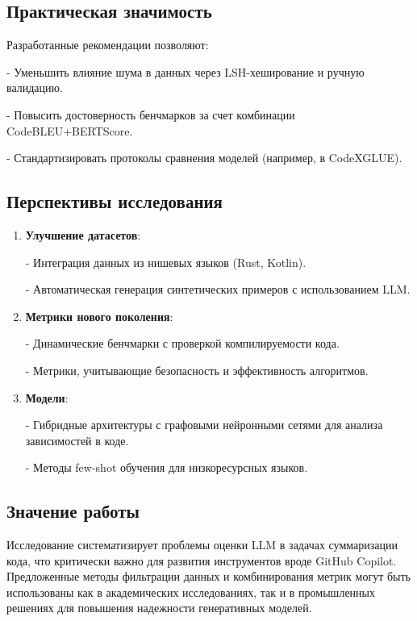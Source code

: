 \documentclass[14pt]{article}
\theoremstyle{definition}
\begin{document}
\subsection{Практическая значимость}
Разработанные рекомендации позволяют:

    
- Уменьшить влияние шума в данных через LSH-хеширование и ручную валидацию.
    
- Повысить достоверность бенчмарков за счет комбинации CodeBLEU+BERTScore.
    
- Стандартизировать протоколы сравнения моделей (например, в CodeXGLUE).


\subsection{Перспективы исследования}
\begin{enumerate}
    \item \textbf{Улучшение датасетов}:
    
        
- Интеграция данных из нишевых языков (Rust, Kotlin).
        
- Автоматическая генерация синтетических примеров с использованием LLM.
    
    
    \item \textbf{Метрики нового поколения}:
    
        
- Динамические бенчмарки с проверкой компилируемости кода.
        
- Метрики, учитывающие безопасность и эффективность алгоритмов.
    
    
    \item \textbf{Модели}:
    
        
- Гибридные архитектуры с графовыми нейронными сетями для анализа зависимостей в коде.
        
- Методы few-shot обучения для низкоресурсных языков.
    
\end{enumerate}

\subsection{Значение работы}
Исследование систематизирует проблемы оценки LLM в задачах суммаризации кода, что критически важно для развития инструментов вроде GitHub Copilot. Предложенные методы фильтрации данных и комбинирования метрик могут быть использованы как в академических исследованиях, так и в промышленных решениях для повышения надежности генеративных моделей.
\end{document}
